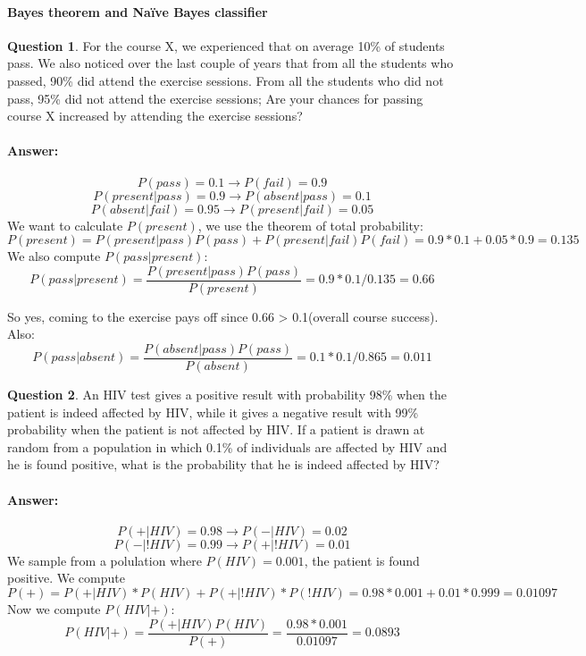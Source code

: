 \documentclass[11pt,a4paper]{article}
\theoremstyle{definition}%
\newtheorem{Q}{Question}[] %
\newcommand{\reponse}[1]{%
\ifthenelse {\boolean{corrige}} {\paragraph{Answer:} \color{darkblue}   #1\color{black}} {}
}
\begin{document}
\paragraph{Bayes theorem and Na\"ive Bayes classifier}
\begin{Q}
For the course X, we experienced that on average 10\% of students pass. We also noticed
over the last couple of years that from all the students who passed, 90\% did attend the exercise
sessions. From all the students who did not pass, 95\% did not attend the exercise sessions;
Are your chances for passing course X increased by attending the exercise sessions?
\reponse{
    $$P(pass) = 0.1 \rightarrow P(fail) = 0.9$$
    $$P(present|pass) = 0.9 \rightarrow P(absent|pass) = 0.1$$
    $$P(absent|fail) = 0.95 \rightarrow P(present|fail) = 0.05$$
    We want to calculate $P(present)$, we use the theorem of total probability:
    $$P(present) = P(present|pass)P(pass) + P(present|fail)P(fail) = 0.9*0.1+0.05*0.9 = 0.135$$
    We also compute $P(pass|present)$:
    $$P(pass|present) = \frac{P(present|pass)P(pass)}{P(present)} = 0.9*0.1/0.135 = 0.66 $$

    So yes, coming to the exercise pays off since 0.66 > 0.1(overall course success).
    Also:
    $$P(pass|absent) = \frac{P(absent|pass)P(pass)}{P(absent)} = 0.1*0.1/0.865 = 0.011 $$
}
\end{Q}

\begin{Q}
An HIV test gives a positive result with probability 98\% when the patient is indeed affected by
HIV, while it gives a negative result with 99\% probability when the patient is not affected by HIV.
If a patient is drawn at random from a population in which 0.1\% of individuals are affected by HIV
and he is found positive, what is the probability that he is indeed affected by HIV?
\reponse{
    $$P(+|HIV) = 0.98 \rightarrow P(-|HIV) = 0.02$$
    $$P(-|!HIV) = 0.99 \rightarrow P(+|!HIV) = 0.01$$
    We sample from a polulation where $P(HIV) = 0.001$, the patient is found positive. 
    We compute $$P(+) = P(+|HIV)*P(HIV) + P(+|!HIV)*P(!HIV) = 0.98*0.001 + 0.01*0.999 = 0.01097$$
    Now we compute $P(HIV|+)$:
    $$P(HIV|+) = \frac{P(+|HIV)P(HIV)}{P(+)} = \frac{0.98*0.001}{0.01097} = 0.0893 $$ 
}
\end{Q}
\end{document}
